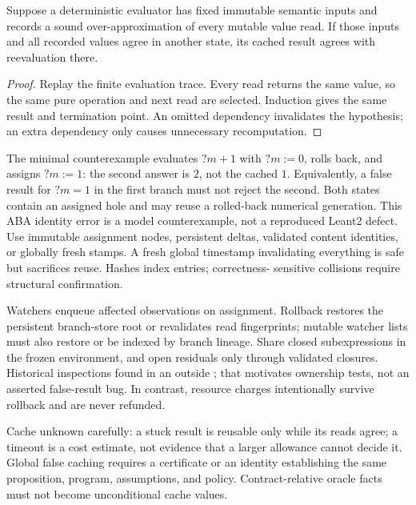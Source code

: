 \begin{proposition}\label{prop:evaluation-cache}
Suppose a deterministic evaluator has fixed immutable semantic inputs and
records a sound over-approximation of every mutable value read. If those inputs
and all recorded values agree in another state, its cached result agrees with
reevaluation there.
\end{proposition}
\begin{proof}
Replay the finite evaluation trace. Every read returns the same value, so the
same pure operation and next read are selected. Induction gives the same result
and termination point. An omitted dependency invalidates the hypothesis; an
extra dependency only causes unnecessary recomputation.
\end{proof}

The minimal counterexample evaluates $?m+1$ with $?m:=0$, rolls back, and assigns
$?m:=1$: the second answer is $2$, not the cached $1$. Equivalently, a false
result for $?m=1$ in the first branch must not reject the second. Both states
contain an assigned hole and may reuse a rolled-back numerical generation.
This ABA identity error is a model counterexample, not a reproduced Leant2
defect. Use immutable assignment nodes, persistent deltas, validated content
identities, or globally fresh stamps. A fresh global timestamp invalidating
everything is safe but sacrifices reuse. Hashes index entries; correctness-
sensitive collisions require structural confirmation.

Watchers enqueue affected observations on assignment. Rollback restores the
persistent branch-store root or revalidates read fingerprints; mutable watcher
lists must also restore or be indexed by branch lineage. Share closed
subexpressions in the frozen environment, and open residuals only through
validated closures. Historical inspections found  in an
 outside ; that motivates ownership tests,
not an asserted false-result bug. In contrast, resource charges intentionally
survive rollback and are never refunded.

Cache unknown carefully: a stuck result is reusable only while its reads agree;
a timeout is a cost estimate, not evidence that a larger allowance cannot
decide it. Global false caching requires a certificate or an identity
establishing the same proposition, program, assumptions, and policy.
Contract-relative oracle facts must not become unconditional cache values.

